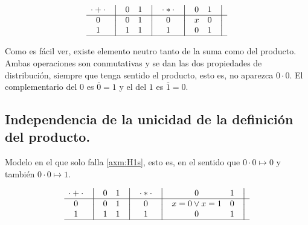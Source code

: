 \[
    \begin{matrix}
        {\cdot + \cdot} & \big{\vert} & {0} & {1} & \big{\vert} \\
        \hline
        {0}             & \big{\vert} & {0} & {1} & \big{\vert} \\
        {1}             & \big{\vert} & {1} & {1} & \big{\vert} \\
        \hline
    \end{matrix}
    \quad
    \begin{matrix}
        {\cdot * \cdot} & \big{\vert} & {0} & {1} & \big{\vert} \\
        \hline
        {0}                   & \big{\vert} & {x} & {0} & \big{\vert} \\
        {1}                   & \big{\vert} & {0} & {1} & \big{\vert} \\
        \hline
    \end{matrix}
\]



	Como es fácil ver, existe elemento neutro tanto de la suma como del
producto. Ambas operaciones son conmutativas y se dan las dos propiedades de
distribución, siempre que tenga sentido el producto, esto es, no aparezca \(0 \cdot 0\). El complementario del \(0\) es \(\overline 0 = 1\) y el del
\(1\) es \(\overline 1 = 0\).



\subsection{Independencia de la unicidad de la definición del producto.}



Modelo en el que solo falla \ref{axm:H1s}, esto es, en el sentido que \(0
\cdot 0 \mapsto 0\) y también \(0 \cdot 0 \mapsto 1\).



\[
    \begin{matrix}
        {\cdot + \cdot} & \big{\vert} & {0} & {1} & \big{\vert} \\
        \hline
        {0}             & \big{\vert} & {0} & {1} & \big{\vert} \\
        {1}             & \big{\vert} & {1} & {1} & \big{\vert} \\
        \hline
    \end{matrix}
    \quad
    \begin{matrix}
        {\cdot * \cdot} & \big{\vert} & {0} & {1} & \big{\vert} \\
        \hline
        {0}                   & \big{\vert} & {x=0 \vee x=1} & {0} & \big{\vert} \\
        {1}                   & \big{\vert} & {0} & {1} & \big{\vert} \\
        \hline
    \end{matrix}
\]



